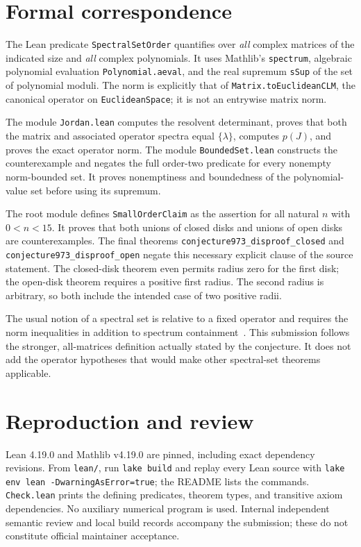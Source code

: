 \documentclass[11pt]{article}
\begin{document}
\clearpage
\section{Formal correspondence}
The Lean predicate \texttt{SpectralSetOrder} quantifies over \emph{all} complex matrices of the indicated size and \emph{all} complex polynomials. It uses Mathlib's \texttt{spectrum}, algebraic polynomial evaluation \texttt{Polynomial.aeval}, and the real supremum \texttt{sSup} of the set of polynomial moduli. The norm is explicitly that of \texttt{Matrix.toEuclideanCLM}, the canonical operator on \texttt{EuclideanSpace}; it is not an entrywise matrix norm.

The module \texttt{Jordan.lean} computes the resolvent determinant, proves that both the matrix and associated operator spectra equal $\{\lambda\}$, computes $p(J)$, and proves the exact operator norm. The module \texttt{BoundedSet.lean} constructs the counterexample and negates the full order-two predicate for every nonempty norm-bounded set. It proves nonemptiness and boundedness of the polynomial-value set before using its supremum.

The root module defines \texttt{SmallOrderClaim} as the assertion for all natural $n$ with $0<n<15$. It proves that both unions of closed disks and unions of open disks are counterexamples. The final theorems \texttt{conjecture973\_disproof\_closed} and \texttt{conjecture973\_disproof\_open} negate this necessary explicit clause of the source statement. The closed-disk theorem even permits radius zero for the first disk; the open-disk theorem requires a positive first radius. The second radius is arbitrary, so both include the intended case of two positive radii.

The usual notion of a spectral set is relative to a fixed operator and requires the norm inequalities in addition to spectrum containment~\cite{bbc}. This submission follows the stronger, all-matrices definition actually stated by the conjecture. It does not add the operator hypotheses that would make other spectral-set theorems applicable.

\section{Reproduction and review}
Lean 4.19.0 and Mathlib v4.19.0 are pinned, including exact dependency revisions. From \texttt{lean/}, run \texttt{lake build} and replay every Lean source with \texttt{lake env lean -DwarningAsError=true}; the README lists the commands. \texttt{Check.lean} prints the defining predicates, theorem types, and transitive axiom dependencies. No auxiliary numerical program is used. Internal independent semantic review and local build records accompany the submission; these do not constitute official maintainer acceptance.
\end{document}

